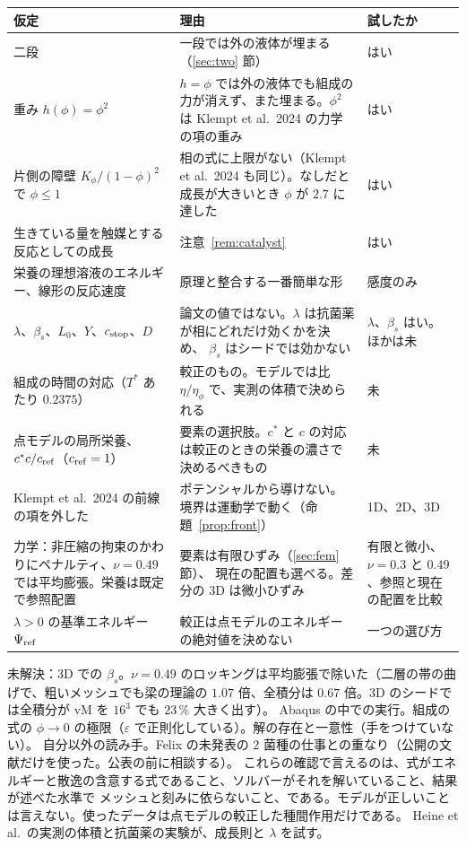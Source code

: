 \documentclass[11pt,a4paper]{article}
\theoremstyle{definition}
\begin{document}
\begin{center}\small
\begin{tabularx}{\linewidth}{@{}YYp{2.6cm}@{}}
\toprule
仮定 & 理由 & 試したか\\
\midrule
二段 & 一段では外の液体が埋まる（\ref{sec:two} 節） & はい\\
重み $h(\phi)=\phi^2$ & $h=\phi$ では外の液体でも組成の力が消えず、また埋まる。$\phi^2$ は Klempt et al.\ 2024 の力学の項の重み & はい\\
片側の障壁 $K_\phi/(1-\phi)^2$ で $\phi\le1$ & 相の式に上限がない（Klempt et al.\ 2024 も同じ）。なしだと成長が大きいとき $\phi$ が $2.7$ に達した & はい\\
生きている量を触媒とする反応としての成長 & 注意~\ref{rem:catalyst} & はい\\
栄養の理想溶液のエネルギー、線形の反応速度 & 原理と整合する一番簡単な形 & 感度のみ\\
$\lambda$、$\beta_s$、$L_0$、$Y$、$c_{\rm stop}$、$D$ & 論文の値ではない。$\lambda$ は抗菌薬が相にどれだけ効くかを決め、
$\beta_s$ はシードでは効かない & $\lambda$、$\beta_s$ はい。ほかは未\\
組成の時間の対応（$T^*$ あたり $0.2375$） & 較正のもの。モデルでは比 $\eta/\eta_\phi$ で、実測の体積で決められる & 未\\
点モデルの局所栄養、$c^*c/c_{\rm ref}$（$c_{\rm ref}=1$） & 要素の選択肢。$c^*$ と $c$ の対応は較正のときの栄養の濃さで決めるべきもの & 未\\
Klempt et al.\ 2024 の前線の項を外した & ポテンシャルから導けない。境界は運動学で動く（命題~\ref{prop:front}） & 1D、2D、3D\\
力学：非圧縮の拘束のかわりにペナルティ、$\nu=0.49$ では平均膨張。栄養は既定で参照配置 & 要素は有限ひずみ（\ref{sec:fem} 節）、
現在の配置も選べる。差分の 3D は微小ひずみ & 有限と微小、$\nu=0.3$ と $0.49$、参照と現在の配置を比較\\
$\lambda>0$ の基準エネルギー $\Psi_{\rm ref}$ & 較正は点モデルのエネルギーの絶対値を決めない & 一つの選び方\\
\bottomrule
\end{tabularx}
\end{center}

\noindent 未解決：3D での $\beta_s$。$\nu=0.49$ のロッキングは平均膨張で除いた（二層の帯の曲げで、粗いメッシュでも梁の理論の
$1.07$ 倍、全積分は $0.67$ 倍。3D のシードでは全積分が vM を $16^3$ でも $23\,\%$ 大きく出す）。
Abaqus の中での実行。組成の式の $\phi\to0$ の極限（$\varepsilon$ で正則化している）。解の存在と一意性（手をつけていない）。
自分以外の読み手。Felix の未発表の 2 菌種の仕事との重なり（公開の文献だけを使った。公表の前に相談する）。
これらの確認で言えるのは、式がエネルギーと散逸の含意する式であること、ソルバーがそれを解いていること、結果が述べた水準で
メッシュと刻みに依らないこと、である。モデルが正しいことは言えない。使ったデータは点モデルの較正した種間作用だけである。
Heine et al.\ の実測の体積と抗菌薬の実験が、成長則と $\lambda$ を試す。
\end{document}
